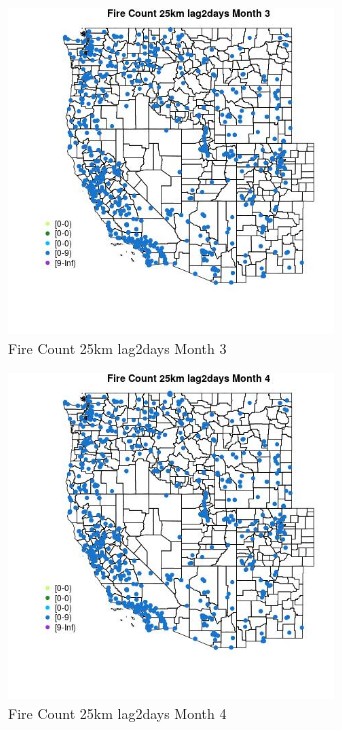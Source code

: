 \begin{figure} 
\centering  
\includegraphics[width=0.77\textwidth]{Code_Outputs/Report_ML_input_PM25_Step4_part_e_de_duplicated_aves_compiled_2019-05-21wNAs_MapObsMo3Fire_Count_25km_lag2days.jpg} 
\caption{\label{fig:Report_ML_input_PM25_Step4_part_e_de_duplicated_aves_compiled_2019-05-21wNAsMapObsMo3Fire_Count_25km_lag2days}Fire Count 25km lag2days Month 3} 
\end{figure} 
 

\begin{figure} 
\centering  
\includegraphics[width=0.77\textwidth]{Code_Outputs/Report_ML_input_PM25_Step4_part_e_de_duplicated_aves_compiled_2019-05-21wNAs_MapObsMo4Fire_Count_25km_lag2days.jpg} 
\caption{\label{fig:Report_ML_input_PM25_Step4_part_e_de_duplicated_aves_compiled_2019-05-21wNAsMapObsMo4Fire_Count_25km_lag2days}Fire Count 25km lag2days Month 4} 
\end{figure} 
 

